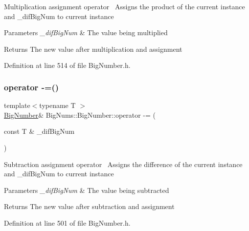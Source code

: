 Multiplication assignment operator~\newline
Assigns the product of the current instance and \+\_\+dif\+Big\+Num to current instance 
\begin{DoxyParams}{Parameters}
{\em \+\_\+dif\+Big\+Num} & The value being multiplied \\
\hline
\end{DoxyParams}
\begin{DoxyReturn}{Returns}
The new value after multiplication and assignment 
\end{DoxyReturn}


Definition at line 514 of file Big\+Number.\+h.

\mbox{\label{class_big_nums_1_1_big_number_a2ac4094870ea13bc9b81c712dabe173e}} 
\subsubsection{\texorpdfstring{operator -\/=()}{operator -=()}}
{\footnotesize\ttfamily template$<$typename T $>$ \\
\mbox{\hyperlink{class_big_nums_1_1_big_number}{Big\+Number}}\& Big\+Nums\+::\+Big\+Number\+::operator -\/= (\begin{DoxyParamCaption}\item[{const T \&}]{\+\_\+dif\+Big\+Num }\end{DoxyParamCaption})\hspace{0.3cm}{\ttfamily [inline]}}

Subtraction assignment operator~\newline
Assigns the difference of the current instance and \+\_\+dif\+Big\+Num to current instance 
\begin{DoxyParams}{Parameters}
{\em \+\_\+dif\+Big\+Num} & The value being subtracted \\
\hline
\end{DoxyParams}
\begin{DoxyReturn}{Returns}
The new value after subtraction and assignment 
\end{DoxyReturn}


Definition at line 501 of file Big\+Number.\+h.

\mbox{\label{class_big_nums_1_1_big_number_a946dfd2531068c7e07946cb4b9af8fa2}} 
